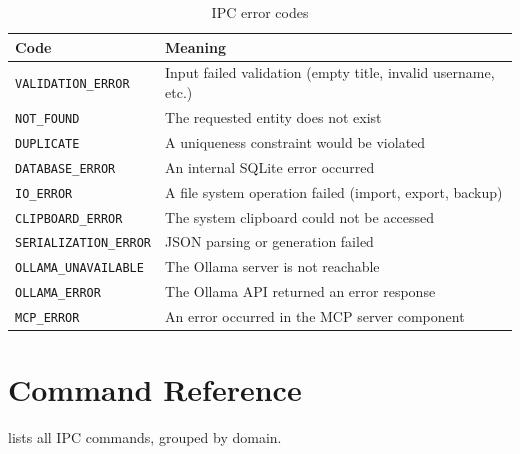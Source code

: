 \documentclass[a4paper, 11pt, oneside]{report}
\begin{document}
\begin{table}[H]
  \centering
  \caption{IPC error codes}
  \label{tab:error-codes}
  \begin{tabularx}{\textwidth}{l X}
    \toprule
    \textbf{Code} & \textbf{Meaning} \\
    \midrule
    \texttt{VALIDATION\_ERROR}   & Input failed validation (empty title, invalid username, etc.) \\
    \texttt{NOT\_FOUND}          & The requested entity does not exist \\
    \texttt{DUPLICATE}           & A uniqueness constraint would be violated \\
    \texttt{DATABASE\_ERROR}     & An internal SQLite error occurred \\
    \texttt{IO\_ERROR}           & A file system operation failed (import, export, backup) \\
    \texttt{CLIPBOARD\_ERROR}    & The system clipboard could not be accessed \\
    \texttt{SERIALIZATION\_ERROR}& JSON parsing or generation failed \\
    \texttt{OLLAMA\_UNAVAILABLE} & The Ollama server is not reachable \\
    \texttt{OLLAMA\_ERROR}       & The Ollama API returned an error response \\
    \texttt{MCP\_ERROR}          & An error occurred in the MCP server component \\
    \bottomrule
  \end{tabularx}
\end{table}

\section{Command Reference}
\label{sec:commands}

 lists all IPC commands, grouped by domain.
\end{document}
